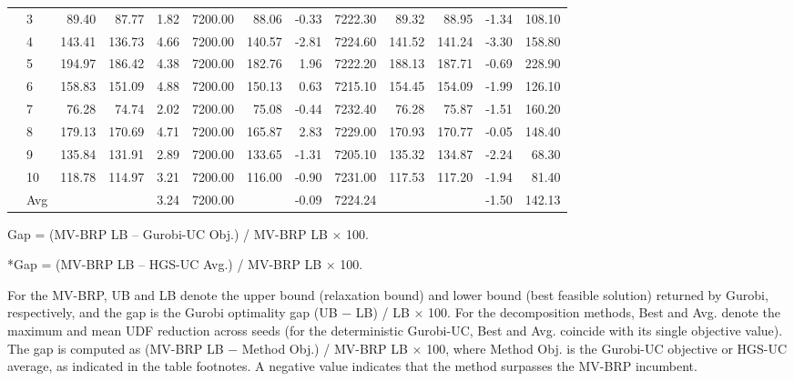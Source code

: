 \documentclass[11pt]{article}
\numberwithin{table}{section}
\numberwithin{figure}{section}
\begin{document}
\begin{landscape}
\begin{table}[p]
\begin{adjustbox}{max width=\linewidth}
\begin{tabular}{llrrrrrrr rrrr}
 & 3 & 89.40 & 87.77 & 1.82 & 7200.00 & 88.06 & -0.33 & 7222.30 & 89.32 & 88.95 & -1.34 & 108.10 \\
 & 4 & 143.41 & 136.73 & 4.66 & 7200.00 & 140.57 & -2.81 & 7224.60 & 141.52 & 141.24 & -3.30 & 158.80 \\
 & 5 & 194.97 & 186.42 & 4.38 & 7200.00 & 182.76 & 1.96 & 7222.20 & 188.13 & 187.71 & -0.69 & 228.90 \\
 & 6 & 158.83 & 151.09 & 4.88 & 7200.00 & 150.13 & 0.63 & 7215.10 & 154.45 & 154.09 & -1.99 & 126.10 \\
 & 7 & 76.28 & 74.74 & 2.02 & 7200.00 & 75.08 & -0.44 & 7232.40 & 76.28 & 75.87 & -1.51 & 160.20 \\
 & 8 & 179.13 & 170.69 & 4.71 & 7200.00 & 165.87 & 2.83 & 7229.00 & 170.93 & 170.77 & -0.05 & 148.40 \\
 & 9 & 135.84 & 131.91 & 2.89 & 7200.00 & 133.65 & -1.31 & 7205.10 & 135.32 & 134.87 & -2.24 & 68.30 \\
 & 10 & 118.78 & 114.97 & 3.21 & 7200.00 & 116.00 & -0.90 & 7231.00 & 117.53 & 117.20 & -1.94 & 81.40 \\
\midrule
 & Avg &  &  & 3.24 & 7200.00 &  & -0.09 & 7224.24 &  &  & -1.50 & 142.13 \\
\bottomrule
\end{tabular}
\end{adjustbox}
\begin{tablenotes}\footnotesize
\item *Gap = (MV-BRP LB -- Gurobi-UC Obj.) / MV-BRP LB $\times$ 100.
\item **Gap = (MV-BRP LB -- HGS-UC Avg.) / MV-BRP LB $\times$ 100.
\end{tablenotes}
\end{table}
\end{landscape}

For the MV-BRP, UB and LB denote the upper bound (relaxation bound) and lower bound (best feasible solution) returned by Gurobi, respectively, and the gap is the Gurobi optimality gap (UB − LB) / LB × 100. For the decomposition methods, Best and Avg. denote the maximum and mean UDF reduction across seeds (for the deterministic Gurobi-UC, Best and Avg. coincide with its single objective value). The gap is computed as (MV-BRP LB − Method Obj.) / MV-BRP LB × 100, where Method Obj. is the Gurobi-UC objective or HGS-UC average, as indicated in the table footnotes. A negative value indicates that the method surpasses the MV-BRP incumbent.
\end{document}
